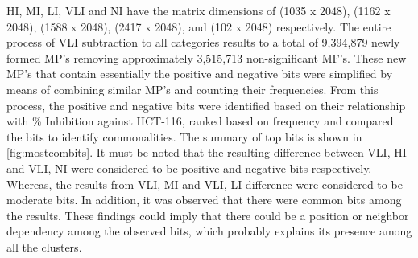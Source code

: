 HI, MI, LI, VLI and NI have the matrix dimensions of (1035 x 2048), (1162 x 2048), (1588 x 2048), (2417 x 2048), and (102 x 2048) respectively. The entire process of VLI subtraction to all categories results to a total of 9,394,879 newly formed MP's removing approximately 3,515,713 non-significant MF's. These new MP's that contain essentially the positive and negative bits were simplified by means of combining similar MP's and counting their frequencies. From this process, the positive and negative bits were identified based on their relationship with \% Inhibition against HCT-116, ranked based on frequency and compared the bits to identify commonalities. The summary of top bits is shown in \autoref{fig:mostcombits}. It must be noted that the resulting difference between VLI, HI and VLI, NI were considered to be positive and negative bits respectively. Whereas, the results from VLI, MI and VLI, LI difference were considered to be moderate bits. In addition, it was observed that there were common bits among the results. These findings could imply that there could be a position or neighbor dependency among the observed bits, which probably explains its presence among all the clusters.





